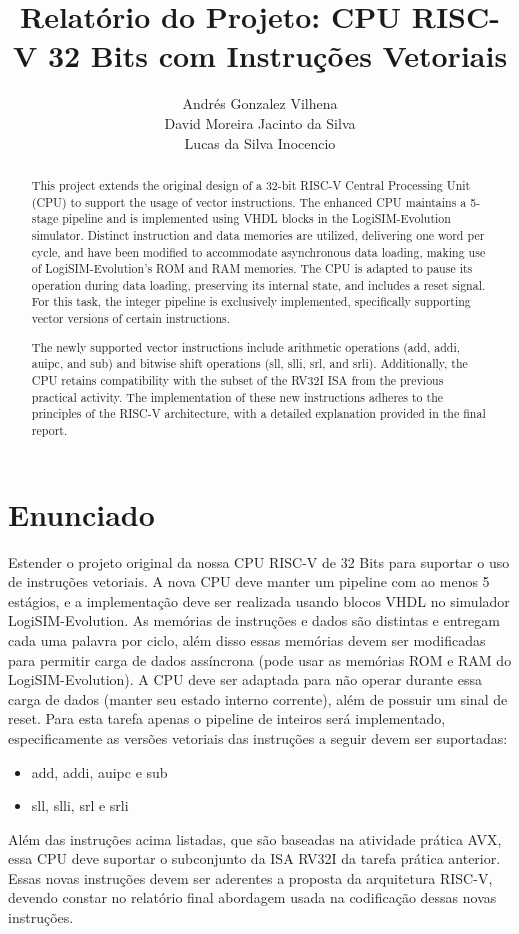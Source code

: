 \documentclass[12pt]{article}
\title{Relatório do Projeto: CPU RISC-V 32 Bits com Instruções Vetoriais}
\author{Andrés Gonzalez Vilhena\\
        David Moreira Jacinto da Silva\\
        Lucas da Silva Inocencio}
\begin{document}
\maketitle

\begin{abstract}
This project extends the original design of a 32-bit RISC-V Central Processing Unit (CPU) to support the usage of vector instructions. The enhanced CPU maintains a 5-stage pipeline and is implemented using VHDL blocks in the LogiSIM-Evolution simulator. Distinct instruction and data memories are utilized, delivering one word per cycle, and have been modified to accommodate asynchronous data loading, making use of LogiSIM-Evolution's ROM and RAM memories. The CPU is adapted to pause its operation during data loading, preserving its internal state, and includes a reset signal. For this task, the integer pipeline is exclusively implemented, specifically supporting vector versions of certain instructions.

The newly supported vector instructions include arithmetic operations (add, addi, auipc, and sub) and bitwise shift operations (sll, slli, srl, and srli). Additionally, the CPU retains compatibility with the subset of the RV32I ISA from the previous practical activity. The implementation of these new instructions adheres to the principles of the RISC-V architecture, with a detailed explanation provided in the final report.
\end{abstract}

\section{Enunciado}

Estender o projeto original da nossa CPU RISC-V de 32 Bits para suportar o uso de
instruções vetoriais. A nova CPU deve manter um pipeline com ao menos 5 estágios, e a
implementação deve ser realizada usando blocos VHDL no simulador LogiSIM-Evolution. As
memórias de instruções e dados são distintas e entregam cada uma palavra por ciclo, além
disso essas memórias devem ser modificadas para permitir carga de dados assíncrona
(pode usar as memórias ROM e RAM do LogiSIM-Evolution). A CPU deve ser adaptada
para não operar durante essa carga de dados (manter seu estado interno corrente), além de
possuir um sinal de reset. Para esta tarefa apenas o pipeline de inteiros será implementado,
especificamente as versões vetoriais das instruções a seguir devem ser suportadas:
\begin{itemize}
    \item add, addi, auipc e sub
    \item sll, slli, srl e srli
\end{itemize}
Além das instruções acima listadas, que são baseadas na atividade prática AVX,
essa CPU deve suportar o subconjunto da ISA RV32I da tarefa prática anterior. Essas
novas instruções devem ser aderentes a proposta da arquitetura RISC-V, devendo constar
no relatório final abordagem usada na codificação dessas novas instruções.
\end{document}
